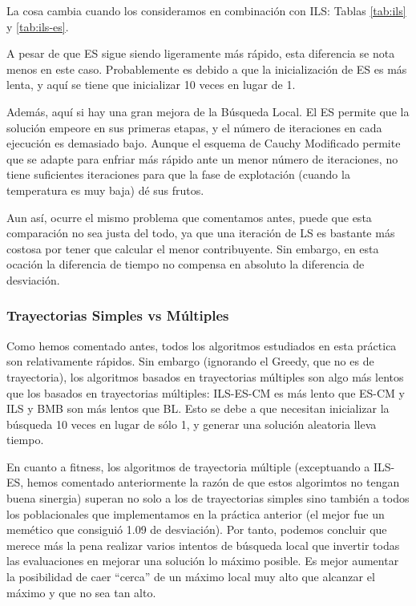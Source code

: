 \documentclass{article}
\begin{document}
La cosa cambia cuando los consideramos en combinación con ILS: Tablas \ref{tab:ils} y \ref{tab:ils-es}.

A pesar de que ES sigue siendo ligeramente más rápido, esta diferencia se nota menos en este caso. Probablemente es debido
a que la inicialización de ES es más lenta, y aquí se tiene que inicializar 10 veces en lugar de 1.

Además, aquí si hay una gran mejora de la Búsqueda Local. El ES permite que la solución empeore en sus primeras etapas, y el
número de iteraciones en cada ejecución es demasiado bajo. Aunque el esquema de Cauchy Modificado permite que se adapte para
enfriar más rápido ante un menor número de iteraciones, no tiene suficientes iteraciones para que la fase de explotación
(cuando la temperatura es muy baja) dé sus frutos.

Aun así, ocurre el mismo problema que comentamos antes, puede que esta
comparación no sea justa del todo, ya que una iteración de LS es bastante más costosa por tener que calcular el menor contribuyente. Sin embargo, en esta ocación la diferencia de tiempo no compensa en absoluto la diferencia de desviación.

\subsubsection*{Trayectorias Simples vs Múltiples}

Como hemos comentado antes, todos los algoritmos estudiados en esta práctica son relativamente rápidos. Sin embargo
(ignorando el Greedy, que no es de trayectoria), los algoritmos basados en trayectorias múltiples son algo más lentos
que los basados en trayectorias múltiples: ILS-ES-CM es más lento que ES-CM y ILS y BMB son más lentos que BL. Esto
se debe a que necesitan inicializar la búsqueda 10 veces en lugar de sólo 1, y generar una solución aleatoria lleva tiempo.

En cuanto a fitness, los algoritmos de trayectoria múltiple (exceptuando a ILS-ES, hemos comentado anteriormente la razón
de que estos algorimtos no tengan buena sinergia) superan no solo a los de trayectorias simples sino también a todos los poblacionales que implementamos en la práctica anterior (el mejor fue un memético que consiguió 1.09 de desviación).
Por tanto, podemos concluir que merece más la pena realizar varios intentos de búsqueda local que invertir todas las
evaluaciones en mejorar una solución lo máximo posible. Es mejor aumentar la posibilidad de caer ``cerca'' de un máximo local
muy alto que alcanzar el máximo y que no sea tan alto.
\end{document}
